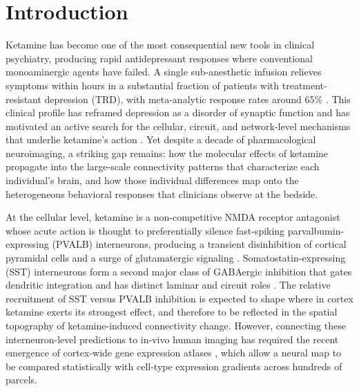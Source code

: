 \section{Introduction}

Ketamine has become one of the most consequential new tools in clinical
psychiatry, producing rapid antidepressant responses where conventional
monoaminergic agents have failed. A single sub-anesthetic infusion relieves
symptoms within hours in a substantial fraction of patients with
treatment-resistant depression (TRD), with meta-analytic response rates around
65\% \citep{berman2000ketamine,zarate2006randomized,murrough2013antidepressant}.
This clinical profile has reframed depression as a disorder of synaptic
function and has motivated an active search for the cellular, circuit, and
network-level mechanisms that underlie ketamine's action
\citep{duman2016synaptic,krystal2019ketamine}. Yet despite a decade of
pharmacological neuroimaging, a striking gap remains: how the molecular effects
of ketamine propagate into the large-scale connectivity patterns that
characterize each individual's brain, and how those individual differences map
onto the heterogeneous behavioral responses that clinicians observe at the
bedside.

At the cellular level, ketamine is a non-competitive NMDA receptor antagonist
whose acute action is thought to preferentially silence fast-spiking
parvalbumin-expressing (PVALB) interneurons, producing a transient
disinhibition of cortical pyramidal cells and a surge of glutamatergic
signaling \citep{krystal1994subanesthetic,moghaddam1997activation,homayoun2007nmda}.
Somatostatin-expressing (SST) interneurons form a second major class of
GABAergic inhibition that gates dendritic integration and has distinct
laminar and circuit roles \citep{rudy2011three,tremblay2016gabaergic}. The
relative recruitment of SST versus PVALB inhibition is expected to shape
where in cortex ketamine exerts its strongest effect, and therefore to be
reflected in the spatial topography of ketamine-induced connectivity change.
However, connecting these interneuron-level predictions to in-vivo human
imaging has required the recent emergence of cortex-wide gene expression
atlases \citep{hawrylycz2012anatomically,burt2018hierarchy}, which allow a
neural map to be compared statistically with cell-type expression gradients
across hundreds of parcels.

